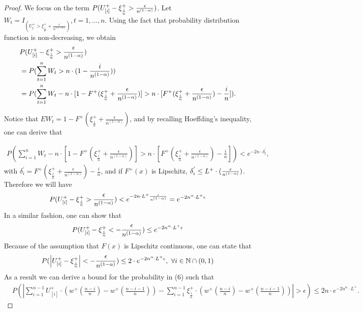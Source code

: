 \begin{proof}
\noindent We focus on the term 
$
P ( U^+_{[i]} - \xi^+_{\frac{i}{n}} > \frac {\epsilon}{n^{(1-\alpha)}})
$.
Let $W_t = I_{(U^+_t > \xi^+_{\frac{i}{n}} + \frac{\epsilon}{n^{(1-\alpha)}})}, t=1, \ldots,n.$ Using the fact that probability distribution function is non-decreasing, we obtain 
\begin{align*}
& P ( U^+_{[i]} - \xi^+_{\frac{i}{n}} > \frac {\epsilon}{n^{(1-\alpha)}}) \\ & = P ( \sum _{t=1}^{n} W_t >
n\cdot(1-\frac{i}{n^{(1-\alpha)}})) \\ & = P ( \sum _{t=1}^{n} W_t - n \cdot [1-F^{+}(\xi^+_{\frac{i}{n}}
+\frac{\epsilon}{n^{(1-\alpha)}})] > n \cdot [F^{+}(\xi^+_{\frac{i}{n}} +\frac{\epsilon}{n^{(1-\alpha)}})
- \frac{i}{n}]).
\end{align*}

\noindent Notice that 
$E W_t = 1-F^{+}(\xi^+_{\frac{i}{n}} +\frac{\epsilon}{n^{(1-\alpha)}})$, and by recalling Hoeffding's inequality, one can derive that

\begin{align}
P ( \sum _{i=1}^{n} W_t - n \cdot [1-F^{+}(\xi^+_{\frac{i}{n}} +\frac{\epsilon}{n^{(1-\alpha) }  } ) ] > n
\cdot [F^{+}(\xi^+_{\frac{i}{n}} +\frac{\epsilon}{n^{(1-\alpha)} } ) - \frac{i}{n}]) < e^{-2n\cdot
\delta^{'}_t},
\end{align}
with $\delta^{'}_i = F^{+}(\xi^+_{\frac{i}{n}} +\frac{\epsilon} {n^{(1-\alpha)} }) - \frac{i}{n}$, and if 
$F^{+}(x)$ is Lipschitz, $ \delta^{'}_i \leq L^{+} \cdot (\frac{\epsilon}{n^{(1-\alpha)}})$.
Therefore we will have
\begin{align}
P ( U^+_{[i]} - \xi^+_{\frac{i}{n}} > \frac {\epsilon}{n^{(1-\alpha)}}) < e^{-2n\cdot L^{+}
\frac{\epsilon}{n^{(1-\alpha)}} } = e^{-2n^\alpha \cdot L ^{+} \epsilon}
\end{align}
In a  similar fashion, one can show that 
\begin{align*}
P ( U^+_{[i]} -\xi^+_{\frac{i}{n}} < -\frac {\epsilon} {n^{(1-\alpha)}}) \leq e^{-2n^\alpha \cdot L^{+}  \epsilon}
\end{align*}
Because of the assumption that $F(x)$ is Lipschitz continuous, one can state that 
\begin{align*}
P ( \left| U^+_{[i]} -\xi^+_{\frac{i}{n}} \right| < -\frac {\epsilon} {n^{(1-\alpha)}}) \leq 2\cdot
e^{-2n^\alpha \cdot L^{+} \epsilon} , \text{   }\forall i\in \mathbb{N} \cap (0,1) 
\end{align*}
As a result we can derive a bound for the probability in (6) such that
\begin{align}
&
P ( \left| \sum_{i=1}^{n-1} U^+_{[i]} \cdot (w^+(\frac{n-i}{n} )  - w^+(\frac{n-i-1}{n} ) ) -
\sum_{i=1}^{n-1} \xi^+_{\frac{i}{n}} \cdot (w^+(\frac{n-i}{n} )  - w^+(\frac{n-i-1}{n} ) ) \right| >
\epsilon) \leq 2n\cdot e^{-2n^\alpha \cdot L^{+}}.\label{eq:holder-sample-complexity-extract}
\end{align}


\end{proof}
